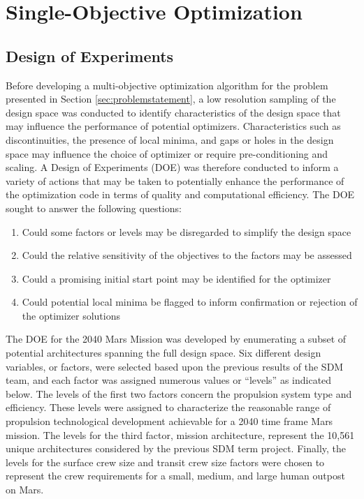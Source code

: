 \documentclass[]{aiaa-pretty}
\begin{document}
\section{Single-Objective Optimization}
\label{sec:single}

\subsection{Design of Experiments}
\label{sec:DOE}
Before developing a multi-objective optimization algorithm for the problem presented in Section \ref{sec:problemstatement}, a low resolution sampling of the design space was conducted to identify characteristics of the design space that may influence the performance of potential optimizers. Characteristics such as discontinuities, the presence of local minima, and gaps or holes in the design space may influence the choice of optimizer or require pre-conditioning and scaling. A Design of Experiments (DOE) was therefore conducted to inform a variety of actions that may be taken to potentially enhance the performance of the optimization code in terms of quality and computational efficiency. The DOE sought to answer the following questions: 

\begin{enumerate}
\item Could some factors or levels may be disregarded to simplify the design space
\item Could the relative sensitivity of the objectives to the factors may be assessed
\item Could a promising initial start point may be identified for the optimizer
\item Could potential local minima be flagged to inform confirmation or rejection of the optimizer solutions
\end{enumerate}

The DOE for the 2040 Mars Mission was developed by enumerating a subset of potential architectures spanning the full design space. Six different design variables, or factors, were selected based upon the previous results of the SDM team, and each factor was assigned numerous values or ``levels'' as indicated below. The levels of the first two factors concern the propulsion system type and efficiency. These levels were assigned to characterize the reasonable range of propulsion technological development achievable for a 2040 time frame Mars mission. The levels for the third factor, mission architecture, represent the 10,561 unique architectures considered by the previous SDM term project. Finally, the levels for the surface crew size and transit crew size factors were chosen to represent the crew requirements for a small, medium, and large human outpost on Mars.
\end{document}

